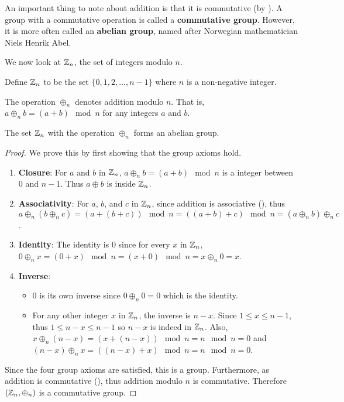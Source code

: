 An important thing to note about addition is that it is commutative (by ). A group with a commutative operation is called a \textbf{commutative group}. However, it is more often called an \textbf{abelian group}, named after Norwegian mathematician Niels Henrik Abel.

We now look at $\mathbb{Z}_n$, the set of integers modulo $n$.
\begin{definition}
    Define $\mathbb{Z}_n$ to be the set $\{0, 1, 2, \dots, n-1\}$ where $n$ is a non-negative integer.
\end{definition}
\begin{definition}
    The operation $\oplus_n$ denotes addition modulo $n$. That is, $a \oplus_n b = (a + b) \mod{n}$ for any integers $a$ and $b$.
\end{definition}
\begin{proposition}\label{prop-Zn-is-abelian-group}
    The set $\mathbb{Z}_n$ with the operation $\oplus_n$ forms an abelian group.
\end{proposition}
\begin{proof}
    We prove this by first showing that the group axioms hold.
    \begin{enumerate}
        \item \textbf{Closure}: For $a$ and $b$ in $\mathbb{Z}_n$, $a \oplus_n b = (a + b) \mod{n}$ is a integer between 0 and $n - 1$. Thus $a \oplus b$ is inside $\mathbb{Z}_n$.
        \item \textbf{Associativity}: For $a$, $b$, and $c$ in $\mathbb{Z}_n$, since addition is associative (), thus $a \oplus_n (b \oplus_n c) = (a + (b + c)) \mod{n} = ((a + b) + c) \mod{n} = (a \oplus_n b) \oplus_n c$.
        \item \textbf{Identity}: The identity is $0$ since for every $x$ in $\mathbb{Z}_n$, $0 \oplus_n x = (0 + x) \mod{n} = (x + 0) \mod{n} = x \oplus_n 0 = x$.
        \item \textbf{Inverse}:
        \begin{itemize}
            \item $0$ is its own inverse since $0 \oplus_n 0 = 0$ which is the identity.
            \item For any other integer $x$ in $\mathbb{Z}_n$, the inverse is $n - x$. Since $1 \leq x \leq n - 1$, thus $1 \leq n - x \leq n - 1$ so $n - x$ is indeed in $\mathbb{Z}_n$. Also, $x \oplus_n (n - x) = (x + (n - x)) \mod{n} = n \mod{n} = 0$ and $(n - x) \oplus_n x = ((n-x) + x)\mod{n} = n \mod{n} = 0$.
        \end{itemize}
    \end{enumerate}
    Since the four group axioms are satisfied, this is a group. Furthermore, as addition is commutative (), thus addition modulo $n$ is commutative. Therefore $(\mathbb{Z}_n, \oplus_n)$ is a commutative group.
\end{proof}
